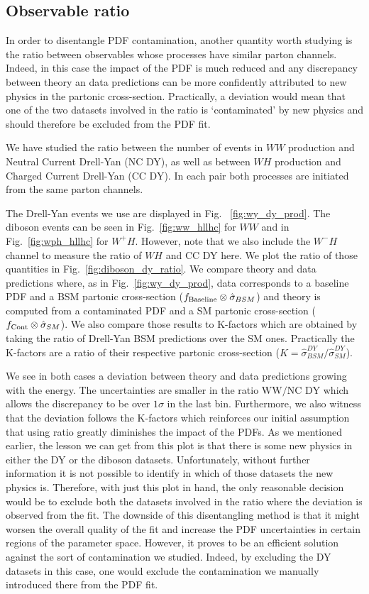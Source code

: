 \documentclass[withindex,glossary]{cam-thesis}
\begin{document}
\subsection{Observable ratio}
\label{subsec:ratio}
In order to disentangle PDF contamination, another quantity worth studying is the ratio between observables whose processes have similar parton channels. Indeed, in this case the impact of the PDF is much reduced and any discrepancy between theory an data predictions can be more confidently attributed to new physics in the partonic cross-section. Practically, a deviation would mean that one of the two datasets involved in the ratio is `contaminated' by new physics and should therefore be excluded from the PDF fit. 

%
We have studied the ratio between the number of events in $WW$ production and Neutral Current Drell-Yan (NC DY), as well as between $WH$ production and Charged Current Drell-Yan (CC DY). In each pair both processes are initiated from the same parton channels. 
%

The Drell-Yan events we use are displayed in Fig. ~\ref{fig:wy_dy_prod}. The diboson events can be seen in Fig.~\ref{fig:ww_hllhc} for $WW$ and in Fig.~\ref{fig:wph_hllhc} for $W^{+}H$. However, note that we also include the $W^{-}H$ channel to measure the ratio of $WH$ and CC DY here. We plot the ratio of those quantities in Fig.~\ref{fig:diboson_dy_ratio}. We compare theory and data predictions where, as in Fig.~\ref{fig:wy_dy_prod}, data corresponds to a baseline PDF and a BSM partonic cross-section ($f_{\rm Baseline} \otimes \hat{\sigma} _{BSM}$) and theory is computed from a contaminated PDF and a SM partonic cross-section ($f_{\rm Cont} \otimes \hat{\sigma}_{SM}$). We also compare those results to K-factors which are obtained by taking the ratio of Drell-Yan BSM predictions over the SM ones. Practically the K-factors are a ratio of their respective partonic cross-section ($K = \hat{\sigma}^{DY} _{BSM} / \hat{\sigma}^{DY} _{SM}$).

We see in both cases a deviation between theory and data predictions growing with the energy. The uncertainties are smaller in the ratio $\text{WW} / \text{NC DY}$ which allows the discrepancy to be over $1 \sigma$ in the last bin. Furthermore, we also witness that the deviation follows the K-factors which reinforces our initial assumption that using ratio greatly diminishes the impact of the PDFs.
%
As we mentioned earlier, the lesson we can get from this plot is that there is some new physics in either the DY or the diboson datasets. Unfortunately, without further information it is not possible to identify in which of those datasets the new physics is. Therefore, with just this plot in hand, the only reasonable decision would be to exclude both the datasets involved in the ratio where the deviation is observed from the fit. The downside of this disentangling method is that it might worsen the overall quality of the fit and increase the PDF uncertainties in certain regions of the parameter space. However, it proves to be an efficient solution against the sort of contamination we studied. Indeed, by excluding the DY datasets in this case, one would exclude the contamination we manually introduced there from the PDF fit.
\end{document}
